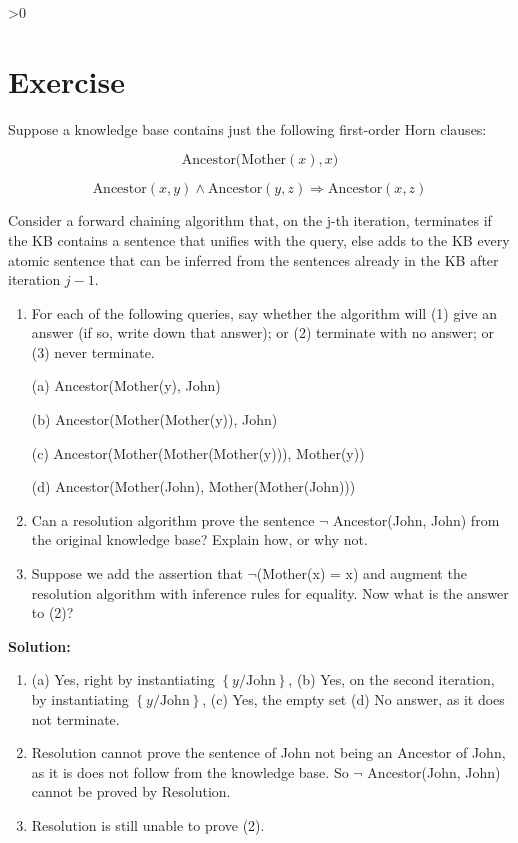 \documentclass{article}
\newcounter{partCounter}
\newcounter{ExerciseCounter}
\newenvironment{Exercise}[1][-1]{
	\ifnum#1>0
	\setcounter{ExerciseCounter}{#1}
	\fi
	\section{Exercise \arabic{ExerciseCounter}}
	\setcounter{partCounter}{1}
}{
}
\newcommand{\solution}{\textbf{\large Solution:}}
\begin{document}
\begin{Exercise}[4]

Suppose a knowledge base contains just the following first-order Horn clauses:

$$\text{Ancestor(Mother}(x),x)$$

$$\text{Ancestor}(x,y) \wedge \text{Ancestor}(y, z) \Rightarrow \text{Ancestor}(x, z)$$

Consider a forward chaining algorithm that, on the j-th iteration, terminates if the KB contains a sentence that unifies with the query, else adds to the KB every atomic sentence that can be inferred from the sentences already in the KB after iteration $j-1$.

\begin{enumerate}

\item For each of the following queries, say whether the algorithm will (1) give
an answer (if so, write down that answer); or (2) terminate with no answer;
or (3) never terminate.

(a) Ancestor(Mother(y), John)

(b) Ancestor(Mother(Mother(y)), John)

(c) Ancestor(Mother(Mother(Mother(y))), Mother(y))

(d) Ancestor(Mother(John), Mother(Mother(John)))

\item Can a resolution algorithm prove the sentence $\lnot$ Ancestor(John, John)
from the original knowledge base? Explain how, or why not.

\item Suppose we add the assertion that $\lnot$(Mother(x) = x) and augment the resolution algorithm with inference rules for equality. Now what is the answer to (2)?

\end{enumerate}

\solution \\

\begin{enumerate}
	
	\item (a) Yes, right by instantiating $\left\{y / \text{John} \right\}$, (b) Yes, on the second iteration, by instantiating $\left\{ y / \text{John} \right\}$, (c) Yes, the empty set (d) No answer, as it does not terminate.

	\item  Resolution cannot prove the sentence of John not being an Ancestor of John, as it is does not follow from the knowledge base. So  $\lnot$ Ancestor(John, John) cannot be proved by Resolution.
	
	\item Resolution is still unable to prove (2).
	
\end{enumerate}

\end{Exercise}
\end{document}
